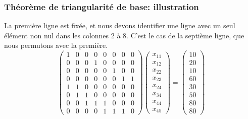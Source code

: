 \documentclass[usepdftitle=false]{beamer}
\begin{document}
\begin{frame}
\frametitle{Théorème de triangularité de base: illustration}

La première ligne est fixée, et nous devons identifier une ligne avec un seul élément non nul dans les colonnes 2 à 8.
C'est le cas de la septième ligne, que nous permutons avec la première.
\[
\begin{pmatrix}
 1 & 0 & 0 & 0 & 0 & 0 & 0 & 0 \\
 0 & 0 & 0 & 1 & 0 & 0 & 0 & 0 \\
 0 & 0 & 0 & 0 & 0 & 1 & 0 & 0 \\
 0 & 0 & 0 & 0 & 0 & 0 & 1 & 1 \\
 1 & 1 & 0 & 0 & 0 & 0 & 0 & 0 \\
 0 & 1 & 1 & 0 & 0 & 0 & 0 & 0 \\
 0 & 0 & 1 & 1 & 1 & 0 & 0 & 0 \\
 0 & 0 & 0 & 0 & 1 & 1 & 1 & 0
\end{pmatrix}
\begin{pmatrix}
x_{11} \\
x_{12} \\
x_{22} \\
x_{23} \\
x_{24} \\
x_{34} \\
x_{44} \\
x_{45}
\end{pmatrix}
=
\begin{pmatrix}
10 \\
20 \\
10 \\
60 \\
30 \\
50 \\
80 \\
80
\end{pmatrix}
\]

\end{frame}
\end{document}
